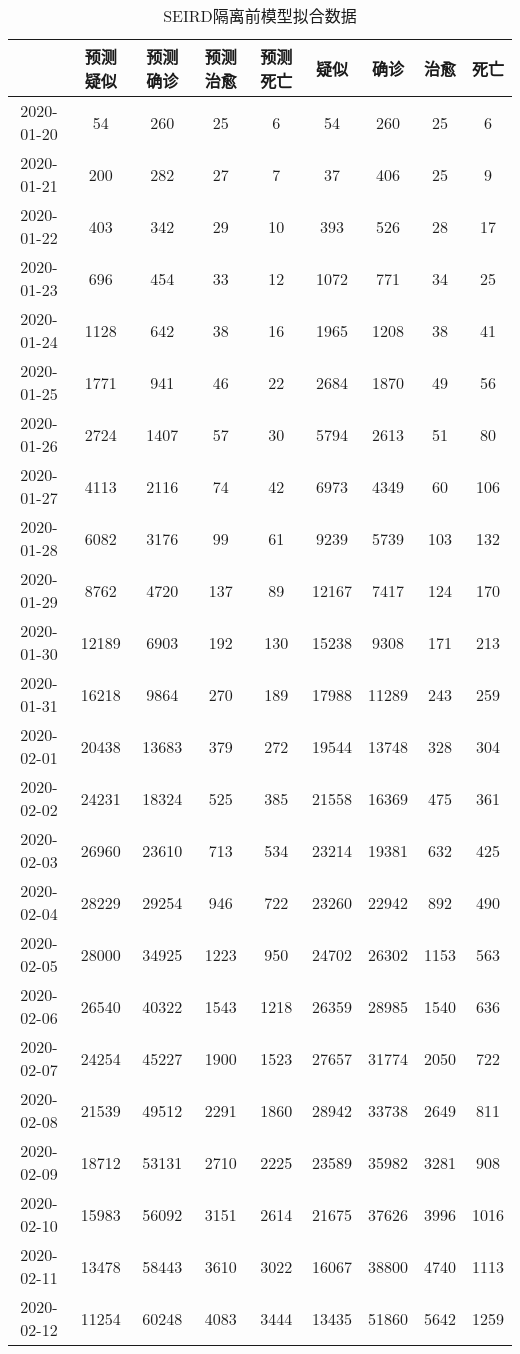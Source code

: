 \begin{longtable}{ccccccccc}
\caption{SEIRD隔离前模型拟合数据}\\
\hline
&预测疑似&预测确诊&预测治愈&预测死亡&疑似&确诊&治愈&死亡\\
\hline
2020-01-20&54&260&25&6&54&260&25&6\\
2020-01-21&200&282&27&7&37&406&25&9\\
2020-01-22&403&342&29&10&393&526&28&17\\
2020-01-23&696&454&33&12&1072&771&34&25\\
2020-01-24&1128&642&38&16&1965&1208&38&41\\
2020-01-25&1771&941&46&22&2684&1870&49&56\\
2020-01-26&2724&1407&57&30&5794&2613&51&80\\
2020-01-27&4113&2116&74&42&6973&4349&60&106\\
2020-01-28&6082&3176&99&61&9239&5739&103&132\\
2020-01-29&8762&4720&137&89&12167&7417&124&170\\
2020-01-30&12189&6903&192&130&15238&9308&171&213\\
2020-01-31&16218&9864&270&189&17988&11289&243&259\\
2020-02-01&20438&13683&379&272&19544&13748&328&304\\
2020-02-02&24231&18324&525&385&21558&16369&475&361\\
2020-02-03&26960&23610&713&534&23214&19381&632&425\\
2020-02-04&28229&29254&946&722&23260&22942&892&490\\
2020-02-05&28000&34925&1223&950&24702&26302&1153&563\\
2020-02-06&26540&40322&1543&1218&26359&28985&1540&636\\
2020-02-07&24254&45227&1900&1523&27657&31774&2050&722\\
2020-02-08&21539&49512&2291&1860&28942&33738&2649&811\\
2020-02-09&18712&53131&2710&2225&23589&35982&3281&908\\
2020-02-10&15983&56092&3151&2614&21675&37626&3996&1016\\
2020-02-11&13478&58443&3610&3022&16067&38800&4740&1113\\
2020-02-12&11254&60248&4083&3444&13435&51860&5642&1259\\
\hline
\end{longtable}